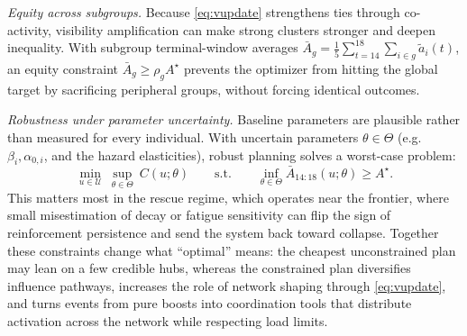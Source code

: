 \documentclass[11pt]{article}
\begin{document}
\emph{Equity across subgroups.} Because \eqref{eq:vupdate} strengthens ties through co-activity, visibility amplification can make strong clusters stronger and deepen inequality. With subgroup terminal-window averages $\bar A_g=\tfrac15\sum_{t=14}^{18}\sum_{i\in g}\tilde a_i(t)$, an equity constraint $\bar A_g\ge\rho_g A^\star$ prevents the optimizer from hitting the global target by sacrificing peripheral groups, without forcing identical outcomes.

\emph{Robustness under parameter uncertainty.} Baseline parameters are plausible rather than measured for every individual. With uncertain parameters $\theta\in\Theta$ (e.g.\ $\beta_i,\alpha_{0,i}$, and the hazard elasticities), robust planning solves a worst-case problem:
\begin{equation*}
\min_{u\in\mathcal U}\ \sup_{\theta\in\Theta}\ C(u;\theta)
\qquad\text{s.t.}\qquad \inf_{\theta\in\Theta}\bar A_{14:18}(u;\theta)\ge A^\star.
\end{equation*}
This matters most in the rescue regime, which operates near the frontier, where small misestimation of decay or fatigue sensitivity can flip the sign of reinforcement persistence and send the system back toward collapse. Together these constraints change what ``optimal'' means: the cheapest unconstrained plan may lean on a few credible hubs, whereas the constrained plan diversifies influence pathways, increases the role of network shaping through \eqref{eq:vupdate}, and turns events from pure boosts into coordination tools that distribute activation across the network while respecting load limits.
\end{document}
